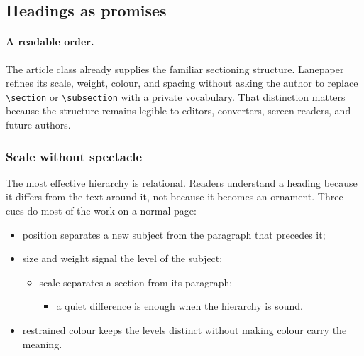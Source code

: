 \documentclass[11pt]{article}
\begin{document}
\subsection{Headings as promises}
\label{subsec:headings}

\paragraph{A readable order.}
The article class already supplies the familiar sectioning structure.
Lanepaper refines its scale, weight, colour, and spacing without asking the
author to replace \verb|\section| or \verb|\subsection| with a private
vocabulary.
That distinction matters because the structure remains legible to editors,
converters, screen readers, and future authors.

\subsubsection{Scale without spectacle}
The most effective hierarchy is relational.
Readers understand a heading because it differs from the text around it, not
because it becomes an ornament.
Three cues do most of the work on a normal page:

\begin{itemize}
  \item position separates a new subject from the paragraph that precedes it;
  \item size and weight signal the level of the subject;
    \begin{itemize}
      \item scale separates a section from its paragraph;
        \begin{itemize}
          \item a quiet difference is enough when the hierarchy is sound.
        \end{itemize}
    \end{itemize}
  \item restrained colour keeps the levels distinct without making colour carry
    the meaning.
\end{itemize}
\end{document}
